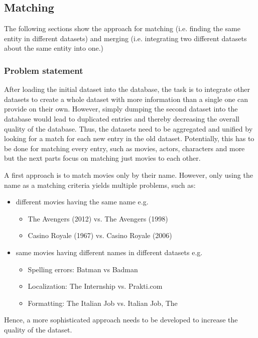 \subsection{Matching}
\label{subsec_method_matching}

The following sections show the approach for matching (i.e. finding the same entity in different datasets) and merging (i.e. integrating two different datasets about the same entity into one.)

\subsubsection{Problem statement}
After loading the initial dataset into the database, the task is to integrate other datasets to create a whole dataset with more information than a single one can provide on their own.
However, simply dumping the second dataset into the database would lead to duplicated entries and thereby decreasing the overall quality of the database.
Thus, the datasets need to be aggregated and unified by looking for a match for each new entry in the old dataset.
Potentially, this has to be done for matching every entry, such as movies, actors, characters and more but the next parts focus on matching just movies to each other.

A first approach is to match movies only by their name.
However, only using the name as a matching criteria yields multiple problems, such as:
\begin{itemize}
	\item different movies having the same name e.g.
	\begin{itemize} 
        \item The Avengers (2012) vs. The Avengers (1998)
        \item Casino Royale (1967) vs. Casino Royale (2006)
    \end{itemize}
	\item same movies having different names in different datasets e.g.
	\begin{itemize} 
        \item Spelling errors: Batman vs Badman
        \item Localization: The Internship vs. Prakti.com
        \item Formatting: The Italian Job vs. Italian Job, The
     \end{itemize}
\end{itemize}
Hence, a more sophisticated approach needs to be developed to increase the quality of the dataset.

